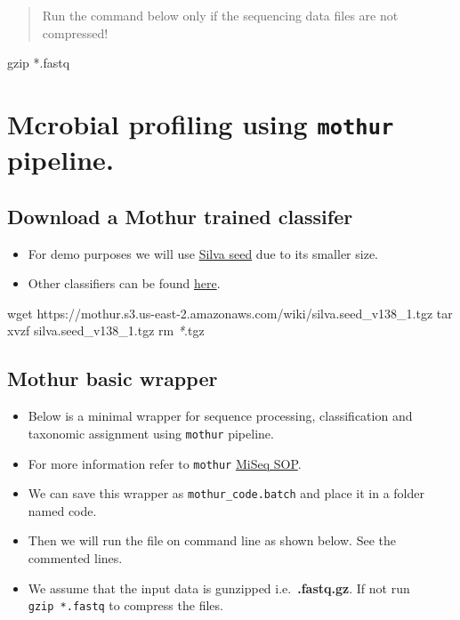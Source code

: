 \documentclass[
  12pt,
  openany]{book}
\newenvironment{Shaded}{\begin{snugshade}}{\end{snugshade}}
\newcommand{\FunctionTok}[1]{\textcolor[rgb]{0.00,0.00,0.00}{#1}}
\newcommand{\NormalTok}[1]{#1}
\newcommand{\PreprocessorTok}[1]{\textcolor[rgb]{0.56,0.35,0.01}{\textit{#1}}}
\providecommand{\tightlist}{%
  \setlength{\itemsep}{0pt}\setlength{\parskip}{0pt}}
\begin{document}
\begin{quote}
Run the command below only if the sequencing data files are not
compressed!
\end{quote}

gzip *.fastq

\hypertarget{mcrobial-profiling-using-mothur-pipeline.}{%
\chapter{\texorpdfstring{Mcrobial profiling using \texttt{mothur} pipeline.}{Mcrobial profiling using mothur pipeline.}}\label{mcrobial-profiling-using-mothur-pipeline.}}

\hypertarget{download-a-mothur-trained-classifer}{%
\section{Download a Mothur trained classifer}\label{download-a-mothur-trained-classifer}}

\begin{itemize}
\tightlist
\item
  For demo purposes we will use \href{https://mothur.org/wiki/Silva_reference_files}{Silva seed} due to its smaller size.
\item
  Other classifiers can be found \href{https://mothur.org/wiki/taxonomy_outline/}{here}.
\end{itemize}

\begin{Shaded}
\begin{Highlighting}[]
\FunctionTok{wget}\NormalTok{ https://mothur.s3.us{-}east{-}2.amazonaws.com/wiki/silva.seed\_v138\_1.tgz}
\FunctionTok{tar}\NormalTok{ xvzf silva.seed\_v138\_1.tgz}
\FunctionTok{rm} \PreprocessorTok{*}\NormalTok{.tgz}
\end{Highlighting}
\end{Shaded}

\hypertarget{mothur-basic-wrapper}{%
\section{Mothur basic wrapper}\label{mothur-basic-wrapper}}

\begin{itemize}
\tightlist
\item
  Below is a minimal wrapper for sequence processing, classification and taxonomic assignment using \texttt{mothur} pipeline.
\item
  For more information refer to \texttt{mothur} \href{https://mothur.org/wiki/miseq_sop/}{MiSeq SOP}.
\item
  We can save this wrapper as \texttt{mothur\_code.batch} and place it in a folder named code.
\item
  Then we will run the file on command line as shown below. See the commented lines.
\item
  We assume that the input data is gunzipped i.e.~\textbf{.fastq.gz}. If not run \texttt{gzip\ *.fastq} to compress the files.
\end{itemize}
\end{document}
